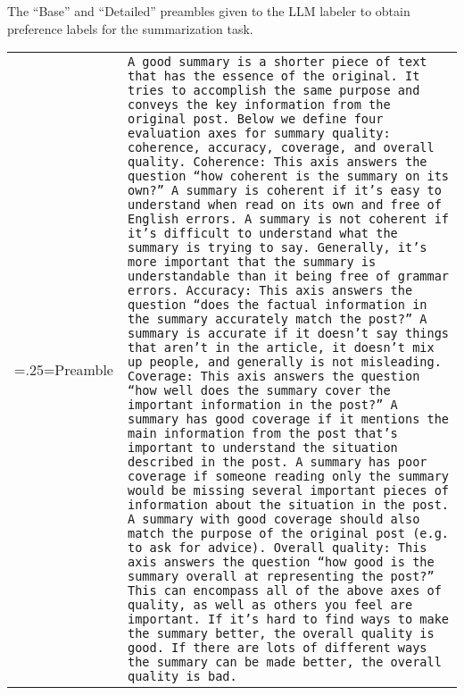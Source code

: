 \documentclass[11pt]{article}
\begin{document}
\begin{table*}[ht]
    \caption{The ``Base'' and ``Detailed'' preambles given to the LLM labeler to obtain preference labels for the summarization task.}
    \label{table:base_vs_openai_preambles}
\end{table*}



\begin{table*}[ht]
\small
\centering
    \begin{tabularx}{\linewidth}{>{\hsize=.25\hsize\linewidth=\hsize}X|X}
    Preamble & \texttt{A good summary is a shorter piece of text that has the essence of the original. It tries to accomplish the same purpose and conveys the key information from the original post. Below we define four evaluation axes for summary quality: coherence, accuracy, coverage, and overall quality.
    \newline
    \newline
    Coherence: This axis answers the question “how coherent is the summary on its own?” A summary is coherent if it's easy to understand when read on its own and free of English errors. A summary is not coherent if it's difficult to understand what the summary is trying to say. Generally, it's more important that the summary is understandable than it being free of grammar errors.
    \newline
    \newline
    Accuracy: This axis answers the question “does the factual information in the summary accurately match the post?” A summary is accurate if it doesn't say things that aren't in the article, it doesn't mix up people, and generally is not misleading.
    \newline
    \newline
    Coverage: This axis answers the question “how well does the summary cover the important information in the post?” A summary has good coverage if it mentions the main information from the post that's important to understand the situation described in the post. A summary has poor coverage if someone reading only the summary would be missing several important pieces of information about the situation in the post. A summary with good coverage should also match the purpose of the original post (e.g. to ask for advice).
    \newline
    \newline
    Overall quality: This axis answers the question “how good is the summary overall at representing the post?” This can encompass all of the above axes of quality, as well as others you feel are important. If it's hard to find ways to make the summary better, the overall quality is good. If there are lots of different ways the summary can be made better, the overall quality is bad.
}
\end{tabularx}
\end{table*}
\end{document}
